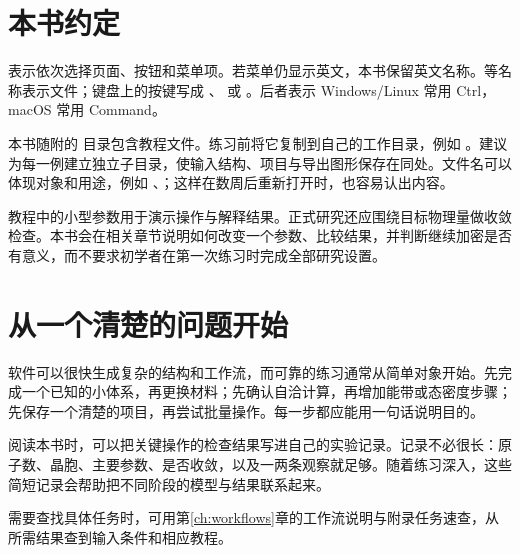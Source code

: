 \section{本书约定}
表示依次选择页面、按钮和菜单项。若菜单仍显示英文，本书保留英文名称。等名称表示文件；键盘上的按键写成 、 或 。后者表示 Windows/Linux 常用 Ctrl，macOS 常用 Command。

本书随附的  目录包含教程文件。练习前将它复制到自己的工作目录，例如 。建议为每一例建立独立子目录，使输入结构、项目与导出图形保存在同处。文件名可以体现对象和用途，例如 、；这样在数周后重新打开时，也容易认出内容。

教程中的小型参数用于演示操作与解释结果。正式研究还应围绕目标物理量做收敛检查。本书会在相关章节说明如何改变一个参数、比较结果，并判断继续加密是否有意义，而不要求初学者在第一次练习时完成全部研究设置。

\section{从一个清楚的问题开始}
软件可以很快生成复杂的结构和工作流，而可靠的练习通常从简单对象开始。先完成一个已知的小体系，再更换材料；先确认自洽计算，再增加能带或态密度步骤；先保存一个清楚的项目，再尝试批量操作。每一步都应能用一句话说明目的。

阅读本书时，可以把关键操作的检查结果写进自己的实验记录。记录不必很长：原子数、晶胞、主要参数、是否收敛，以及一两条观察就足够。随着练习深入，这些简短记录会帮助把不同阶段的模型与结果联系起来。


需要查找具体任务时，可用第\ref{ch:workflows}章的工作流说明与附录任务速查，从所需结果查到输入条件和相应教程。
